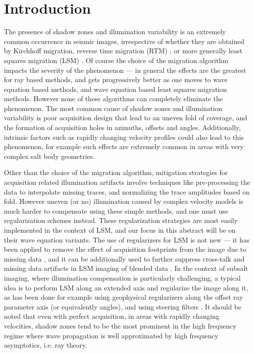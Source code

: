 \section{Introduction}

The presence of shadow zones and illumination variability is an extremely common occurrence in seismic images, irrespective of whether they are obtained by Kirchhoff migration, reverse time migration (RTM) \citep{baysal1983reverse}, or more generally least squares migration (LSM) \citep{nemeth1999least, ronen2000least, dai2012multi}. Of course the choice of the migration algorithm impacts the severity of the phenomenon --- in general the effects are the greatest for ray based methods, and gets progressively better as one moves to wave equation based methods, and wave equation based least squares migration methods. However none of these algorithms can completely eliminate the phenomenon. The most common cause of shadow zones and illumination variability is poor acquisition design that lead to an uneven fold of coverage, and the formation of acquisition holes in azimuths, offsets and angles. Additionally, intrinsic factors such as rapidly changing velocity profiles could also lead to this phenomenon, for example such effects are extremely common in areas with very complex salt body geometries.

Other than the choice of the migration algorithm, mitigation strategies for acquisition related illumination artifacts involve techniques like pre-processing the data to interpolate missing traces, and normalizing the trace amplitudes based on fold. However uneven (or no) illumination caused by complex velocity models is much harder to compensate using these simple methods, and one must use regularization schemes instead. These regularization strategies are most easily implemented in the context of LSM, and our focus in this abstract will be on their wave equation variants. The use of regularizers for LSM is not new --- it has been applied to remove the effect of acquisition footprints from the image due to missing data \citep{nemeth1999least}, and it can be additionally used to further suppress cross-talk and missing data artifacts in LSM imaging of blended data \citep{tang2009least, xue2015seismic}. In the context of subsalt imaging, where illumination compensation is particularly challenging, a typical idea is to perform LSM along an extended axis and regularize the image along it, as has been done for example using geophysical regularizers along the offset ray parameter axis (or equivalently angles), and using steering filters \citep{prucha2002subsalt, clapp2005imaging, clapp2005regularized, kuehl2001generalized}. It should be noted that even with perfect acquisition, in areas with rapidly changing velocities, shadow zones tend to be the most prominent in the high frequency regime where wave propagation is well approximated by high frequency asymptotics, i.e. ray theory.

